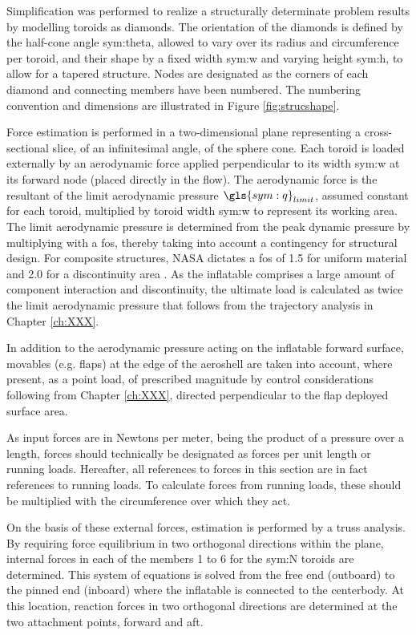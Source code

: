 Simplification was performed to realize a structurally determinate problem results by modelling toroids as diamonds. The orientation of the diamonds is defined by the half-cone angle \gls{sym:theta}, allowed to vary over its radius and circumference per toroid, and their shape by a fixed width \gls{sym:w} and varying height \gls{sym:h}, to allow for a tapered structure. Nodes are designated as the corners of each diamond and connecting members have been numbered. The numbering convention and dimensions are illustrated in Figure \ref{fig:strucshape}. 

Force estimation is performed in a two-dimensional plane representing a cross-sectional slice, of an infinitesimal angle, of the sphere cone. Each toroid is loaded externally by an aerodynamic force applied perpendicular to its width \gls{sym:w} at its forward node (placed directly in the flow). The aerodynamic force is the resultant of the limit aerodynamic pressure $\gls{sym:q}_{limit}$, assumed constant for each toroid, multiplied by toroid width \gls{sym:w} to represent its working area. The limit aerodynamic pressure is determined from the peak dynamic pressure by multiplying with a \acrfull{fos}, thereby taking into account a contingency for structural design. For composite structures, NASA dictates a \gls{fos} of 1.5 for uniform material and 2.0 for a discontinuity area \cite{Technical2014}. As the inflatable comprises a large amount of component interaction and discontinuity, the ultimate load is calculated as twice the limit aerodynamic pressure that follows from the trajectory analysis in Chapter \ref{ch:XXX}.

In addition to the aerodynamic pressure acting on the inflatable forward surface, movables (e.g. flaps) at the edge of the aeroshell are taken into account, where present, as a point load, of prescribed magnitude by control considerations following from Chapter \ref{ch:XXX}, directed perpendicular to the flap deployed surface area.

As input forces are in Newtons per meter, being the product of a pressure over a length, forces should technically be designated as forces per unit length or running loads. Hereafter, all references to forces in this section are in fact references to running loads. To calculate forces from running loads, these should be multiplied with the circumference over which they act.

On the basis of these external forces, estimation is performed by a truss analysis. By requiring force equilibrium in two orthogonal directions within the plane, internal forces in each of the members 1 to 6 for the \gls{sym:N} toroids are determined. This system of equations is solved from the free end (outboard) to the pinned end (inboard) where the inflatable is connected to the centerbody. At this location, reaction forces in two orthogonal directions are determined at the two attachment points, forward and aft.

